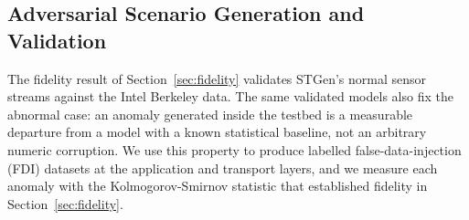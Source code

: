 \documentclass[jsan,article,submit,moreauthors,pdftex]{Definitions/mdpi}
\begin{document}





\subsection{Adversarial Scenario Generation and Validation}
\label{sec:adversarial}

The fidelity result of Section~\ref{sec:fidelity} validates STGen's normal sensor streams against the Intel Berkeley data. The same validated models also fix the abnormal case: an anomaly generated inside the testbed is a measurable departure from a model with a known statistical baseline, not an arbitrary numeric corruption. We use this property to produce labelled false-data-injection (FDI) datasets at the application and transport layers, and we measure each anomaly with the Kolmogorov-Smirnov statistic that established fidelity in Section~\ref{sec:fidelity}.
\end{document}
